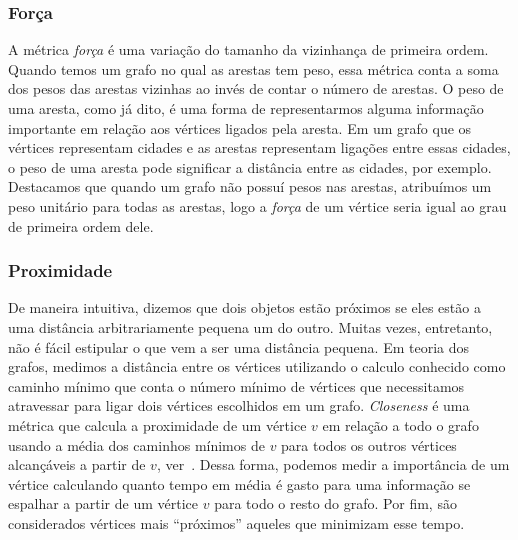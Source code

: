\subsubsection{Força}
\label{subsubsection::strength}

A métrica \textit{força} é uma variação do tamanho da vizinhança de primeira ordem. Quando temos um grafo no qual as arestas tem peso, essa métrica conta a soma dos pesos das arestas vizinhas ao invés de contar o número de arestas. O peso de uma aresta, como já dito, é uma forma de representarmos alguma informação importante em relação aos vértices ligados pela aresta. Em um grafo que os vértices representam cidades e as arestas representam ligações entre essas cidades, o peso de uma aresta pode significar a distância entre as cidades, por exemplo. Destacamos que quando um grafo não possuí pesos nas arestas, atribuímos um peso unitário para todas as arestas, logo a \textit{força} de um vértice seria igual ao grau de primeira ordem dele.

\subsubsection{Proximidade}
\label{subsubsection::closeness}

De maneira intuitiva, dizemos que dois objetos estão próximos se eles estão a uma distância arbitrariamente pequena um do outro. Muitas vezes, entretanto, não é fácil estipular o que vem a ser uma distância pequena. Em teoria dos grafos, medimos a distância entre os vértices utilizando o calculo conhecido como caminho mínimo que conta o número mínimo de vértices que necessitamos atravessar para ligar dois vértices escolhidos em um grafo. \textit{Closeness} é uma métrica que calcula a proximidade de um vértice $v$ em relação a todo o grafo usando a média dos caminhos mínimos de $v$ para todos os outros vértices alcançáveis a partir de $v$, ver~\cite{Beauchamp65}. Dessa forma, podemos medir a importância de um vértice calculando quanto tempo em média é gasto para uma informação se espalhar a partir de um vértice $v$ para todo o resto do grafo. Por fim, são considerados vértices mais ``próximos'' aqueles que minimizam esse tempo.


